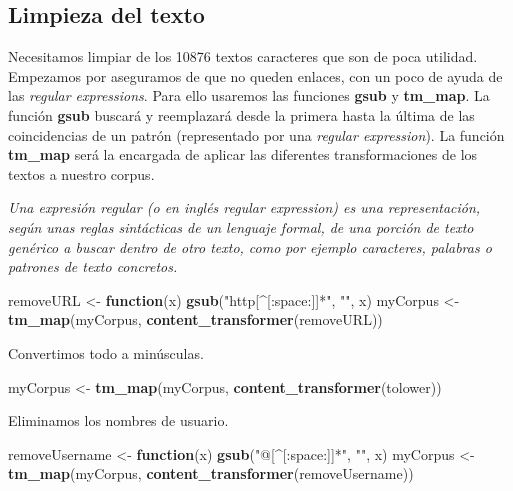 \documentclass[]{article}
\newenvironment{Shaded}{\begin{snugshade}}{\end{snugshade}}
\newcommand{\ControlFlowTok}[1]{\textcolor[rgb]{0.13,0.29,0.53}{\textbf{#1}}}
\newcommand{\KeywordTok}[1]{\textcolor[rgb]{0.13,0.29,0.53}{\textbf{#1}}}
\newcommand{\NormalTok}[1]{#1}
\newcommand{\StringTok}[1]{\textcolor[rgb]{0.31,0.60,0.02}{#1}}
\begin{document}
\hypertarget{limpieza-del-texto}{%
\subsection{Limpieza del texto}\label{limpieza-del-texto}}

Necesitamos limpiar de los 10876 textos caracteres que son de poca
utilidad. Empezamos por aseguramos de que no queden enlaces, con un poco
de ayuda de las \emph{regular expressions}. Para ello usaremos las
funciones \textbf{gsub} y \textbf{tm\_map}. La función \textbf{gsub}
buscará y reemplazará desde la primera hasta la última de las
coincidencias de un patrón (representado por una \emph{regular
expression}). La función \textbf{tm\_map} será la encargada de aplicar
las diferentes transformaciones de los textos a nuestro corpus.

\emph{Una expresión regular (o en inglés regular expression) es una
representación, según unas reglas sintácticas de un lenguaje formal, de
una porción de texto genérico a buscar dentro de otro texto, como por
ejemplo caracteres, palabras o patrones de texto concretos.}

\begin{Shaded}
\begin{Highlighting}[]
\NormalTok{removeURL <-}\StringTok{ }\ControlFlowTok{function}\NormalTok{(x) }\KeywordTok{gsub}\NormalTok{(}\StringTok{"http[^[:space:]]*"}\NormalTok{, }\StringTok{""}\NormalTok{, x)  }
\NormalTok{myCorpus <-}\StringTok{ }\KeywordTok{tm_map}\NormalTok{(myCorpus, }\KeywordTok{content_transformer}\NormalTok{(removeURL))}
\end{Highlighting}
\end{Shaded}

Convertimos todo a minúsculas.

\begin{Shaded}
\begin{Highlighting}[]
\NormalTok{myCorpus <-}\StringTok{ }\KeywordTok{tm_map}\NormalTok{(myCorpus, }\KeywordTok{content_transformer}\NormalTok{(tolower))}
\end{Highlighting}
\end{Shaded}

Eliminamos los nombres de usuario.

\begin{Shaded}
\begin{Highlighting}[]
\NormalTok{removeUsername <-}\StringTok{ }\ControlFlowTok{function}\NormalTok{(x) }\KeywordTok{gsub}\NormalTok{(}\StringTok{"@[^[:space:]]*"}\NormalTok{, }\StringTok{""}\NormalTok{, x)  }
\NormalTok{myCorpus <-}\StringTok{ }\KeywordTok{tm_map}\NormalTok{(myCorpus, }\KeywordTok{content_transformer}\NormalTok{(removeUsername))}
\end{Highlighting}
\end{Shaded}
\end{document}
